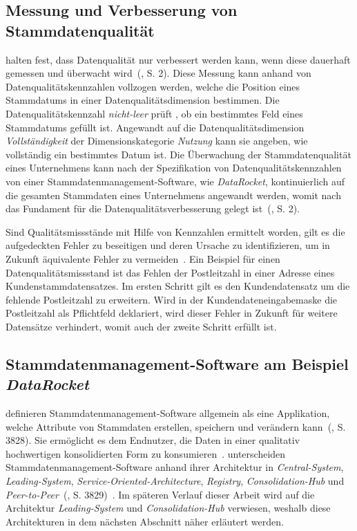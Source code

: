 \documentclass[
  language=german, %
  type=bachelor,%
  ngerman
]{isthesis}
\begin{document}
\begin{content}
	\subsection{Messung und Verbesserung von Stammdatenqualität}
	\textsc{\citeauthor{baghi2013controlling}} halten fest, dass Datenqualität
	nur verbessert werden kann, wenn diese dauerhaft gemessen und überwacht
	wird~(\citeyear{baghi2013controlling}, S. 2). Diese Messung kann anhand von
	Datenqualitätskennzahlen vollzogen werden, welche die Position eines
	Stammdatums in einer Datenqualitätsdimension bestimmen. Die
	Datenqualitätskennzahl \textit{nicht-leer} prüft \zB{}, ob ein bestimmtes Feld
	eines Stammdatums gefüllt ist. Angewandt auf die Datenqualitätsdimension
	\textit{Vollständigkeit} der Dimensionskategorie \textit{Nutzung} kann sie
	angeben, wie vollständig ein bestimmtes Datum ist. Die Überwachung der
	Stammdatenqualität eines Unternehmens kann nach der Spezifikation von
	Datenqualitätskennzahlen von einer Stammdatenmanagement-Software, wie \zB{}
	\textit{DataRocket}, kontinuierlich auf die gesamten Stammdaten eines
	Unternehmens angewandt werden, womit nach
	\textsc{\citeauthor{baghi2013controlling}} das Fundament für die
	Datenqualitätsverbesserung gelegt ist~(\citeyear{baghi2013controlling}, S.
	2).

  Sind Qualitätsmissstände mit Hilfe von Kennzahlen ermittelt worden, gilt es die
  aufgedeckten Fehler zu beseitigen und deren Ursache zu identifizieren, um in
  Zukunft äquivalente Fehler zu vermeiden~\cite[][S. 22]{eckerson2002data}. Ein
  Beispiel für einen Datenqualitätsmissstand ist das Fehlen der Postleitzahl in
  einer Adresse eines Kundenstammdatensatzes. Im ersten Schritt gilt es den
  Kundendatensatz um die fehlende Postleitzahl zu erweitern. Wird in der
  Kundendateneingabemaske die Postleitzahl als Pflichtfeld deklariert, wird
  dieser Fehler in Zukunft für weitere Datensätze verhindert, womit auch der zweite
  Schritt erfüllt ist.


  \subsection{Stammdatenmanagement-Software am Beispiel \textit{DataRocket}}\label{sec:Vorstellung-DataRocket}

  \textsc{\citeauthor{baghi2014toward}} definieren
  Stammdatenmanagement-Software allgemein als eine Applikation, welche
  Attribute von Stammdaten erstellen, speichern und verändern
  kann~(\citeyear{baghi2014toward}, S. 3828). Sie ermöglicht es dem Endnutzer,
  die Daten in einer qualitativ hochwertigen konsolidierten Form zu
  konsumieren~\cite[][Abschnitt 1.2.]{dreibelbis2008enterprise}.
  \textsc{\citeauthor{baghi2014toward}} unterscheiden
  Stammdatenmanagement-Software anhand ihrer Architektur in
  \textit{Central-System}, \textit{Leading-System},
  \textit{Service-Oriented-Architecture}, \textit{Registry},
  \textit{Consolidation-Hub} und
  \textit{Peer-to-Peer}~(\citeyear{baghi2014toward}, S. 3829)~\cite[][Abschnitt
  5.3.1.]{dreibelbis2008enterprise}. Im späteren Verlauf dieser Arbeit wird auf
  die Architektur \textit{Leading-System} und \textit{Consolidation-Hub}
  verwiesen, weshalb diese Architekturen in dem nächsten Abschnitt näher
  erläutert werden.


\end{content}
\end{document}

